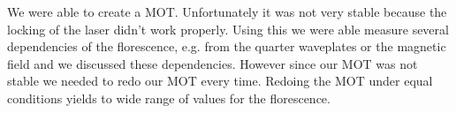 We were able to create a MOT. Unfortunately it was not very stable because the locking of the laser didn't work properly. Using this we were able measure several dependencies of the florescence, e.g. from the quarter waveplates or the magnetic field and we discussed these dependencies. However since our MOT was not stable we needed to redo our MOT every time. Redoing the MOT under equal conditions yields to wide range of values for the florescence.